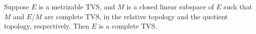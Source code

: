 Suppose $E$ is a metrizable TVS, and $M$ is a closed linear subspace of $E$ such that $M$ and $E/M$ are complete TVS, in the relative topology and the quotient topology, respectively. Then $E$ is a complete TVS.
